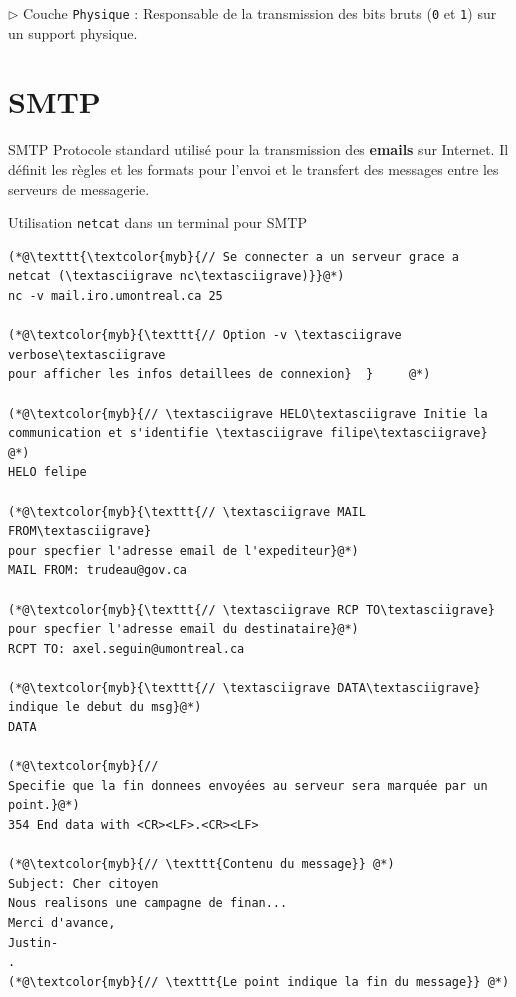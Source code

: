 \documentclass{report}
\begin{document}
\begin{multicols*}{3}
$\rhd$ Couche \texttt{Physique} : Responsable de la transmission des bits bruts (\texttt{0}   et \texttt{1}) 
sur un support physique. 

\vspace{-1em}
    \section{SMTP}
\vspace{-1em}

\begin{Definitionx}{SMTP}{}
    Protocole standard utilisé pour la transmission des \textbf{emails} sur Internet. 
    Il définit les règles et les formats pour 
    l'envoi et le transfert des messages  entre les serveurs de messagerie.    
\end{Definitionx}

\begin{EExample}{Utilisation \texttt{netcat} dans un terminal  pour SMTP}{}

\begin{lstlisting}
(*@\texttt{\textcolor{myb}{// Se connecter a un serveur grace a 
netcat (\textasciigrave nc\textasciigrave)}}@*)
nc -v mail.iro.umontreal.ca 25

(*@\textcolor{myb}{\texttt{// Option -v \textasciigrave verbose\textasciigrave 
pour afficher les infos detaillees de connexion}  }     @*)

(*@\textcolor{myb}{// \textasciigrave HELO\textasciigrave Initie la communication et s'identifie \textasciigrave filipe\textasciigrave}   @*)
HELO felipe

(*@\textcolor{myb}{\texttt{// \textasciigrave MAIL FROM\textasciigrave} 
pour specfier l'adresse email de l'expediteur}@*) 
MAIL FROM: trudeau@gov.ca

(*@\textcolor{myb}{\texttt{// \textasciigrave RCP TO\textasciigrave} 
pour specfier l'adresse email du destinataire}@*) 
RCPT TO: axel.seguin@umontreal.ca

(*@\textcolor{myb}{\texttt{// \textasciigrave DATA\textasciigrave} 
indique le debut du msg}@*) 
DATA

(*@\textcolor{myb}{// 
Specifie que la fin donnees envoyées au serveur sera marquée par un point.}@*) 
354 End data with <CR><LF>.<CR><LF>

(*@\textcolor{myb}{// \texttt{Contenu du message}} @*)
Subject: Cher citoyen
Nous realisons une campagne de finan...
Merci d'avance,
Justin-
.
(*@\textcolor{myb}{// \texttt{Le point indique la fin du message}} @*)


\end{lstlisting}
\end{EExample}
\end{multicols*}
\end{document}
